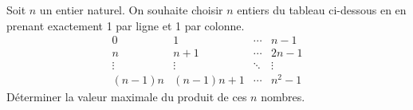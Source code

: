 Soit $n$ un entier naturel. On souhaite choisir $n$ entiers du tableau ci-dessous en en prenant exactement 1 par ligne et 1 par colonne.
$$\begin{array}{cccc}
0        & 1            & \cdots & n - 1 \\
n        & n + 1        & \cdots & 2n - 1 \\
\vdots   & \vdots       & \ddots & \vdots \\
(n - 1)n & (n - 1)n + 1 & \cdots & n^2 - 1
\end{array}$$
Déterminer la valeur maximale du produit de ces $n$ nombres.
